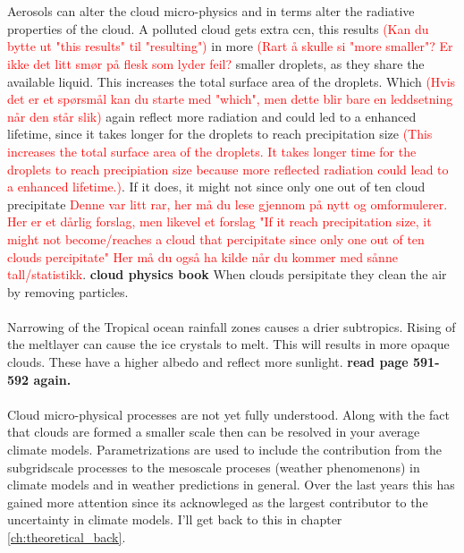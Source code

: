 \\ \\
Aerosols can alter the cloud micro-physics and in terms alter the radiative properties of the cloud. A polluted cloud gets extra \acrshort{ccn}, this results \textcolor{red}{(Kan du bytte ut "this results" til "resulting")} in more \textcolor{red}{(Rart å skulle si "more smaller"? Er ikke det litt smør på flesk som lyder feil?} smaller droplets, as they share the available liquid. This increases the total surface area of the droplets. Which \textcolor{red}{(Hvis det er et spørsmål kan du starte med "which", men dette blir bare en leddsetning når den står slik)} again reflect more radiation and could led to a enhanced lifetime, since it takes longer for the droplets to reach precipitation size \textcolor{red}{(This increases the total surface area of the droplets. It takes longer time for the droplets to reach precipiation size because more reflected radiation could le\textcolor{red}{a}d to a enhanced lifetime.)}. If it does, it might not since only one out of ten cloud precipitate \textcolor{red}{Denne var litt rar, her må du lese gjennom på nytt og omformulerer. Her er et dårlig forslag, men likevel et forslag "If it reach precipitation size, it might not become/reaches a cloud that percipitate since only one out of ten clouds percipitate" Her må du også ha kilde når du kommer med sånne tall/statistikk}. \textbf{cloud physics book} When clouds persipitate they clean the air by removing particles.
\\ \\ 
Narrowing of the Tropical ocean rainfall zones causes a drier subtropics. Rising of the meltlayer can cause the ice crystals to melt. This will results in more opaque clouds. These have a higher albedo and reflect more sunlight. \textbf{read page 591-592 again.}
\\ \\
Cloud micro-physical processes are not yet fully understood. Along with the fact that clouds are formed a smaller scale then can be resolved in your average climate models. Parametrizations are used to include the contribution from the subgridscale processes to the mesoscale proceses (weather phenomenons) in climate models and in weather predictions in general. Over the last years this has gained more attention since its acknowleged as the largest contributor to the uncertainty in climate models. I'll get back to this in chapter \ref{ch:theoretical_back}.

